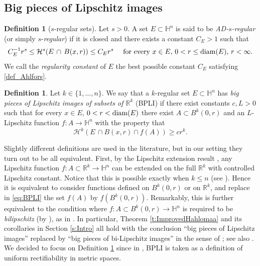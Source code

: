 \documentclass[12pt]{amsart}
\newcommand{\R}{\mathbb R}
\renewcommand{\H}{\mathbb H}
\newcommand{\diam}{{\rm diam}}
\numberwithin{equation}{section}
\theoremstyle{plain}
\theoremstyle{definition}
\newtheorem{definition}[theorem]{Definition}
\theoremstyle{remark}
\begin{document}
\subsection{Big pieces of Lipschitz images}\label{s:BPLI}
\begin{definition}[$s$-regular sets]\label{d:k-reg}
  Let $s>0$. A set $E\subset\H^n$ is said to be \textit{AD-$s$-regular} (or simply $s$-\textit{regular}) if it is closed and there exists a constant $C_E>1$ such that
  \begin{equation}\label{def_Ahlfors}
       C_E^{-1}r^s\leq\mathcal H^s(E\,\cap\,B(x,r) )\leq C_Er^s\quad\text{ for every }x\in E,\, 0<r\leq\diam(E),\,r<\infty. \end{equation}
We call the \textit{regularity constant} of $E$ the best possible constant $C_E$ satisfying \eqref{def_Ahlfors}.
\end{definition}
\begin{definition}\label{def_BPLI}
    Let $k\in\{1,\dots,n\}$. We say that a $k$-regular set $E\subset\H^n$ has \emph{big pieces of Lipschitz images of subsets of $\R^k$} (BPLI) if there exist constants $c, L>0$ such that for every $x\in E$, $0<r<\diam(E)$ there exist $A \subset B^k(0,r)$ and an $L$-Lipschitz function $f:A\to\H^n$ with the property that 
    \begin{equation}\label{eq:BPLI}\mathcal H^k\left(E\,\cap B(x,r)\cap f(A)\right)\geq cr^k.
    \end{equation}
\end{definition}
Slightly different definitions are used in the literature, but in our setting they turn out to be all equivalent.
First, by the Lipschitz extension result \cite{WY10}, any Lipschitz function $f: A\subset\R^k\to\H^n$ can be extended on the full $\R^k$ with controlled Lipschitz constant. Notice that this is possible exactly when $k\leq n$ (see \cite{BF09}). Hence it is equivalent to consider functions defined on $B^k(0,r)$ or on $\R^k$, and replace in \eqref{eq:BPLI} the set $f(A)$ by $f(B^k(0,r))$.
Remarkably, this is further equivalent to the condition where $f:A\subset B^k(0,r)\to \H^n$ is required to be \textit{bilipschitz} (by \cite[Corollary 1.9]{schul09}), as in \cite[Theorem 1.1]{Hahlomaa}. In particular, Theorem \ref{t:ImprovedHahlomaa} and its corollaries in Section \ref{s:Intro} all hold with the conclusion  ``big pieces of Lipschitz images'' replaced by ``big pieces of bi-Lipschitz images'' in the sense of \cite[p.1]{Hahlomaa}; see also \cite[\S 1.2]{Bate}. We decided to focus on Definition \ref{def_BPLI} since in \cite{Bate}, BPLI is taken as a definition of uniform rectifiability in metric spaces.
\end{document}
